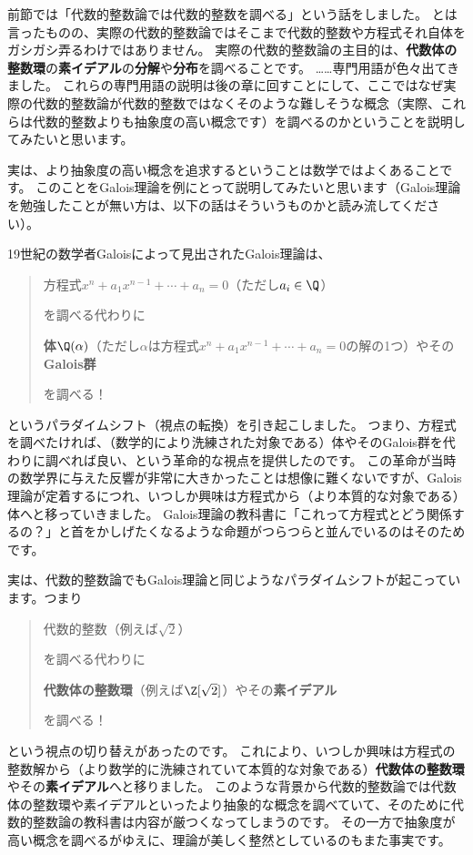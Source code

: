 \documentclass[11pt,b5paper,oneside,titlepage,lualatex]{ltjsreport}
\begin{document}

前節では「代数的整数論では代数的整数を調べる」という話をしました。
とは言ったものの、実際の代数的整数論ではそこまで代数的整数や方程式それ自体をガシガシ弄るわけではありません。
実際の代数的整数論の主目的は、\textbf{代数体の整数環}の\textbf{素イデアル}の\textbf{分解}や\textbf{分布}を調べることです。
……専門用語が色々出てきました。
これらの専門用語の説明は後の章に回すことにして、ここではなぜ実際の代数的整数論が代数的整数ではなくそのような難しそうな概念（実際、これらは代数的整数よりも抽象度の高い概念です）を調べるのかということを説明してみたいと思います。

実は、より抽象度の高い概念を追求するということは数学ではよくあることです。
このことをGalois理論を例にとって説明してみたいと思います（Galois理論を勉強したことが無い方は、以下の話はそういうものかと読み流してください）。

19世紀の数学者Galoisによって見出されたGalois理論は、
\begin{quote}
	\centering
	方程式$ x^n + a_1 x^{n-1} + \cdots + a_n = 0 $（ただし$ a_i \in \Q $）
	
	を調べる代わりに
	
	\textbf{体}$ \Q(\alpha) $（ただし$ \alpha $は方程式$ x^n + a_1 x^{n-1} + \cdots + a_n = 0 $の解の1つ）やその\textbf{Galois群}
	
	を調べる！
\end{quote}
というパラダイムシフト（視点の転換）を引き起こしました。
つまり、方程式を調べたければ、（数学的により洗練された対象である）体やそのGalois群を代わりに調べれば良い、という革命的な視点を提供したのです。
この革命が当時の数学界に与えた反響が非常に大きかったことは想像に難くないですが、Galois理論が定着するにつれ、いつしか興味は方程式から（より本質的な対象である）体へと移っていきました。
Galois理論の教科書に「これって方程式とどう関係するの？」と首をかしげたくなるような命題がつらつらと並んでいるのはそのためです。

実は、代数的整数論でもGalois理論と同じようなパラダイムシフトが起こっています。つまり
\begin{quote}
	\centering
	代数的整数（例えば$ \sqrt{2} $）
	
	を調べる代わりに
	
	\textbf{代数体の整数環}（例えば$ \Z[\sqrt{2}] $）やその\textbf{素イデアル}
	
	を調べる！
\end{quote}
という視点の切り替えがあったのです。
これにより、いつしか興味は方程式の整数解から（より数学的に洗練されていて本質的な対象である）\textbf{代数体の整数環}やその\textbf{素イデアル}へと移りました。
このような背景から代数的整数論では代数体の整数環や素イデアルといったより抽象的な概念を調べていて、そのために代数的整数論の教科書は内容が厳つくなってしまうのです。
その一方で抽象度が高い概念を調べるがゆえに、理論が美しく整然としているのもまた事実です。
\end{document}
